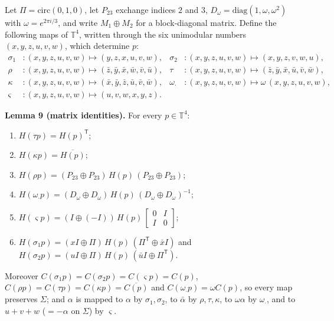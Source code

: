 \documentclass[
  11pt,
]{article}
\providecommand{\tightlist}{%
  \setlength{\itemsep}{0pt}\setlength{\parskip}{0pt}}
\begin{document}
Let \(\Pi=\mathrm{circ}(0,1,0)\), let \(P_{23}\) exchange indices \(2\)
and \(3\), \(D_\omega=\mathrm{diag}(1,\omega,\omega^2)\) with
\(\omega=e^{2\pi i/3}\), and write \(M_1\oplus M_2\) for a
block-diagonal matrix. Define the following maps of \(\mathbb T^4\),
written through the six unimodular numbers \((x,y,z,u,v,w)\), which
determine \(p\): \[
\begin{aligned}
\sigma_1&:(x,y,z,u,v,w)\mapsto(y,z,x,u,v,w), & \sigma_2&:(x,y,z,u,v,w)\mapsto(x,y,z,v,w,u),\\
\rho&:(x,y,z,u,v,w)\mapsto(\bar z,\bar y,\bar x,\bar w,\bar v,\bar u), & \tau&:(x,y,z,u,v,w)\mapsto(\bar z,\bar y,\bar x,\bar u,\bar v,\bar w),\\
\kappa&:(x,y,z,u,v,w)\mapsto(\bar x,\bar y,\bar z,\bar u,\bar v,\bar w), & \omega_\cdot&:(x,y,z,u,v,w)\mapsto\omega\,(x,y,z,u,v,w),\\
\varsigma&:(x,y,z,u,v,w)\mapsto(u,v,w,x,y,z). &&
\end{aligned}
\]

\textbf{Lemma 9 (matrix identities).} For every \(p\in\mathbb T^4\):

\begin{enumerate}
\def\labelenumi{\arabic{enumi}.}
\tightlist
\item
  \(H(\tau p)=H(p)^{\mathsf T}\);
\item
  \(H(\kappa p)=\overline{H(p)}\);
\item
  \(H(\rho p)=(P_{23}\oplus P_{23})\,H(p)\,(P_{23}\oplus P_{23})\);
\item
  \(H(\omega_\cdot p)=(D_\omega\oplus D_\omega)\,H(p)\,(D_\omega\oplus D_\omega)^{-1}\);
\item
  \(H(\varsigma p)=(I\oplus(-I))\,H(p)\,\begin{bmatrix}0&I\\I&0\end{bmatrix}\);
\item
  \(H(\sigma_1p)=(xI\oplus\Pi)\,H(p)\,(\Pi^{\mathsf T}\oplus\bar xI)\)
  and
  \(H(\sigma_2p)=(uI\oplus\Pi)\,H(p)\,(\bar uI\oplus\Pi^{\mathsf T})\).
\end{enumerate}

Moreover \(C(\sigma_1p)=C(\sigma_2p)=C(\varsigma p)=C(p)\),
\(C(\rho p)=C(\tau p)=C(\kappa p)=\overline{C(p)}\) and
\(C(\omega_\cdot p)=\omega C(p)\), so every map preserves \(\Sigma\);
and \(\alpha\) is mapped to \(\alpha\) by \(\sigma_1,\sigma_2\), to
\(\bar\alpha\) by \(\rho,\tau,\kappa\), to \(\omega\alpha\) by
\(\omega_\cdot\), and to \(u+v+w\) (\(=-\alpha\) on \(\Sigma\)) by
\(\varsigma\).
\end{document}
